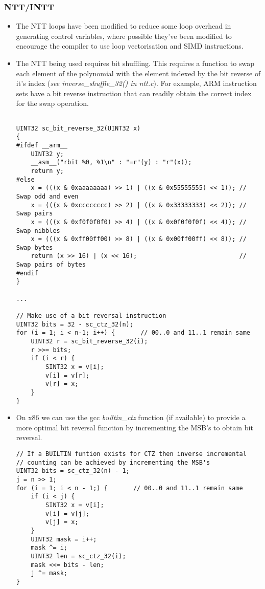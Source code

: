 \subsubsection{NTT/INTT}
\begin{itemize}

  \item The NTT loops have been modified to reduce some loop overhead in generating control variables, where possible they've been modified to encourage the compiler to use loop vectorisation and SIMD instructions.
  \item The NTT being used requires bit shuffling. This requires a function to swap each element of the polynomial with the element indexed by the bit reverse of it's index (\textit{see inverse\_shuffle\_32() in ntt.c}). For example, ARM instruction sets have a bit reverse instruction that can readily obtain the correct index for the swap operation.

\begin{verbatim}

UINT32 sc_bit_reverse_32(UINT32 x)
{
#ifdef __arm__
    UINT32 y;
    __asm__("rbit %0, %1\n" : "=r"(y) : "r"(x));
    return y;
#else
    x = (((x & 0xaaaaaaaa) >> 1) | ((x & 0x55555555) << 1)); // Swap odd and even
    x = (((x & 0xcccccccc) >> 2) | ((x & 0x33333333) << 2)); // Swap pairs
    x = (((x & 0xf0f0f0f0) >> 4) | ((x & 0x0f0f0f0f) << 4)); // Swap nibbles
    x = (((x & 0xff00ff00) >> 8) | ((x & 0x00ff00ff) << 8)); // Swap bytes
    return (x >> 16) | (x << 16);                            // Swap pairs of bytes
#endif
}

...

// Make use of a bit reversal instruction
UINT32 bits = 32 - sc_ctz_32(n);
for (i = 1; i < n-1; i++) {       // 00..0 and 11..1 remain same
    UINT32 r = sc_bit_reverse_32(i);
    r >>= bits;
    if (i < r) {
        SINT32 x = v[i];
        v[i] = v[r];
        v[r] = x;
    }
}
\end{verbatim}

  \item On x86 we can use the gcc \textit{builtin\_ctz} function (if available) to provide a more optimal bit reversal function by incrementing the MSB's to obtain bit reversal.

\begin{verbatim}
// If a BUILTIN funtion exists for CTZ then inverse incremental
// counting can be achieved by incrementing the MSB's
UINT32 bits = sc_ctz_32(n) - 1;
j = n >> 1;
for (i = 1; i < n - 1;) {       // 00..0 and 11..1 remain same
    if (i < j) {
        SINT32 x = v[i];
        v[i] = v[j];
        v[j] = x;
    }
    UINT32 mask = i++;
    mask ^= i;
    UINT32 len = sc_ctz_32(i);
    mask <<= bits - len;
    j ^= mask;
}
\end{verbatim}


\end{itemize}
